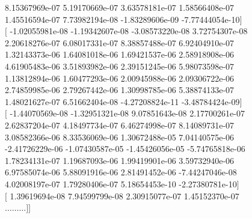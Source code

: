 \documentclass{article}
\begin{document}
    8.15367969e-07   5.19170669e-07   3.63578181e-07   1.58566408e-07 \\
    1.45516594e-07   7.73982194e-08  -1.83289606e-09  -7.77444054e-10$]$ \\
 $[$ -1.02055981e-08  -1.19342607e-08  -3.08573220e-08   3.72754307e-08 \\
    2.20618276e-07   6.08017331e-07   8.38857488e-07   6.92404910e-07 \\
    1.32143373e-06   1.64081018e-06   1.69421537e-06   2.58918908e-06 \\
    4.61905483e-06   3.51893982e-06   2.39151245e-06   5.98073598e-07 \\
    1.13812894e-06   1.60477293e-06   2.00945988e-06   2.09306722e-06 \\
    2.74859985e-06   2.79267442e-06   1.30998785e-06   5.38874133e-07 \\
    1.48021627e-07   6.51662404e-08  -4.27208824e-11  -3.48784424e-09$]$ \\
 $[$ -1.44070569e-08  -1.32951321e-08   9.07851643e-08   2.17700261e-07 \\
    2.62837204e-07   4.18497734e-07   6.46274998e-07   8.14089731e-07 \\
    3.08582366e-06   8.33536069e-06   1.30672488e-05   7.04140575e-06 \\
   -2.41726229e-06  -1.07430587e-05  -1.45426056e-05  -5.74765818e-06 \\
    1.78234131e-07   1.19687093e-06   1.99419901e-06   3.59732940e-06 \\
    6.97585074e-06   5.88091916e-06   2.81491452e-06  -7.44247046e-08 \\
    4.02008197e-07   1.79280406e-07   5.18654453e-10  -2.27380781e-10$]$ \\
 $[$  1.39619694e-08   7.94599799e-08   2.30915077e-07   1.45152370e-07 \\
   $\dots \dots \dots ]]$

\newpage
\end{document}
